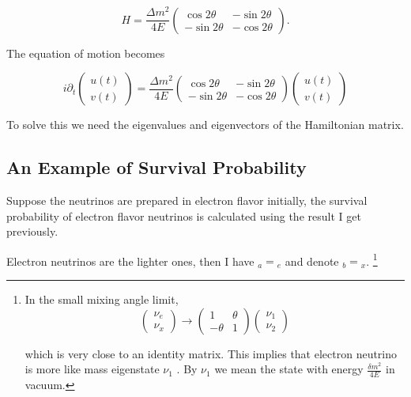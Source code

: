 \documentclass{tufte-handout}
\begin{document}
\begin{equation}
H = \frac{\Delta m^2}{4E} \begin{pmatrix}
\cos 2\theta &  -  \sin 2\theta \\  - \sin 2\theta & - \cos 2\theta
\end{pmatrix}.
\end{equation}

The equation of motion becomes

\begin{equation}
i \partial_t \begin{pmatrix}
u(t) \\ v(t)
\end{pmatrix} = \frac{\Delta m^2}{4E} \begin{pmatrix}
\cos 2\theta &  -  \sin 2\theta \\  - \sin 2\theta & - \cos 2\theta
\end{pmatrix} \begin{pmatrix}
u(t) \\ v(t)
\end{pmatrix}
\end{equation}

To solve this we need the eigenvalues and eigenvectors of the Hamiltonian matrix.



\subsection{An Example of Survival Probability}

Suppose the neutrinos are prepared in electron flavor initially, the survival probability of electron flavor neutrinos is calculated using the result I get previously.



Electron neutrinos are the lighter ones, then I have ${}_a = {}_e$ and denote ${}_b={}_x$. \footnote{In the small mixing angle limit, 
\begin{equation*}
\begin{pmatrix}\nu_e \\ \nu_x\end{pmatrix} \to \begin{pmatrix}  1 & \theta \\ -\theta  & 1 \end{pmatrix}   \begin{pmatrix}\nu_1 \\ \nu_2\end{pmatrix}
\end{equation*}

which is very close to an identity matrix. This implies that electron neutrino is more like mass eigenstate  $\nu_1$ . By $\nu_1$ we mean the state with energy  $\frac{ \delta m^2 }{4E}$ in vacuum.
}
\end{document}
